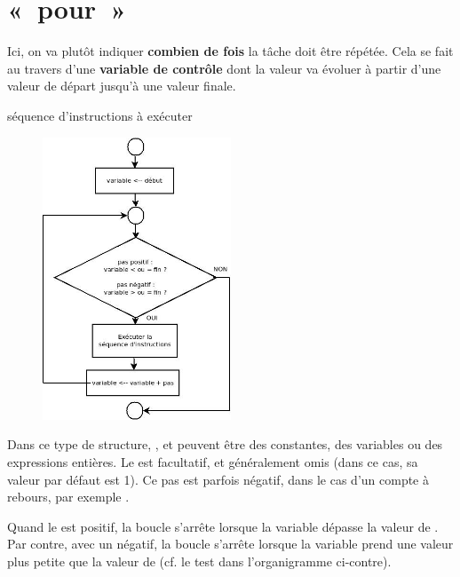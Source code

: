 \clearpage
\section{«~pour~»}

	Ici, on va plutôt indiquer 
	\textbf{combien de fois} la tâche doit être répétée. 
	Cela se fait au travers d’une
	\textbf{variable de contrôle} dont la valeur va évoluer à partir
	d’une valeur de départ jusqu’à une valeur finale.
	
	\begin{LDA}
		\Stmt séquence d’instructions à exécuter
	\EndFor
	\end{LDA}

	\begin{figure}
	\includegraphics[width=0.5\textwidth]{image/boucle-pour}
			\label{fig:boucle-pour}
	\vskip-10mm
	\end{figure}

	Dans ce type de structure, 
	,  et 
	peuvent être des constantes, 
	des variables ou des expressions entières. 
	Le  est facultatif, et généralement omis 
	(dans ce cas, sa valeur par défaut est 1). 
	Ce pas est parfois négatif, dans le cas d’un compte à rebours, 
	par exemple .

	Quand le  est positif, la boucle s’arrête
	lorsque la variable dépasse la valeur de . 
	Par contre, avec un  négatif, 
	la boucle s’arrête lorsque la variable prend une valeur 
	plus petite que la valeur de 
	(cf. le test dans l’organigramme ci-contre).

